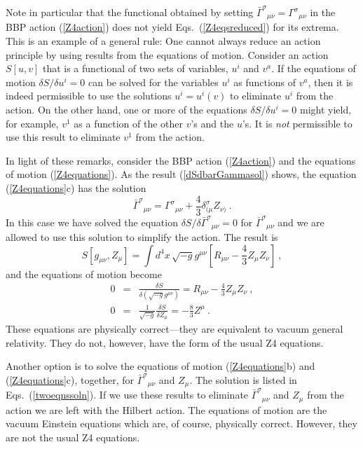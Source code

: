 \documentclass[letterpaper,nofootinbib,prd,amsmath,twocolumn]{revtex4-1}
\begin{document}
Note in particular that the functional obtained by setting 
$\bar\Gamma^\sigma{}_{\mu\nu} = \Gamma^\sigma{}_{\mu\nu}$ in the BBP action (\ref{Z4action}) does 
not yield Eqs.~(\ref{Z4eqsreduced}) for its extrema. 
This is an example of a general rule: One cannot always 
reduce an action principle by using results from the equations of motion. Consider an action $S[u,v]$ that is a functional 
of two sets of variables, $u^i$ and $v^a$. If the equations of motion $\delta S/\delta u^i = 0$ 
can be solved for the variables $u^i$ as functions of $v^a$, 
then it is indeed permissible to use the solutions $u^i = u^i(v)$ to eliminate $u^i$ from the action. 
On the other hand, one or more of the 
equations $\delta S/\delta u^i = 0$ might yield, for example, $v^1$ as a function of the other $v$'s and the $u$'s. 
It is {\it not} permissible to use this result to eliminate $v^1$ from the action. 

In light of these remarks, consider the BBP action (\ref{Z4action}) and the equations of motion 
(\ref{Z4equations}). As the result (\ref{dSdbarGammasol}) shows, the equation (\ref{Z4equations}c) has the solution 
\begin{equation}
	\bar\Gamma^\sigma{}_{\mu\nu}  = \Gamma^\sigma{}_{\mu\nu} + \frac{4}{3} \delta_{(\mu}^\sigma Z_{\nu)} \ .
\end{equation}
In this case we have solved the equation $\delta S/\delta\bar\Gamma^\sigma{}_{\mu\nu} = 0$ 
for $\bar\Gamma^\sigma{}_{\mu\nu}$ and we are allowed to use this solution to simplify the action. The result is 
\begin{equation}\label{altaction}
	S[g_{\mu\nu},Z_\mu] = \int d^4x \, \sqrt{-g}g^{\mu\nu} \left[ R_{\mu\nu} - \frac{4}{3} Z_\mu Z_\nu \right] \ ,
\end{equation}
and the equations of motion become 
\begin{subequations}\label{alteqns}
\begin{eqnarray}
	0 & = & \frac{\delta S}{\delta (\sqrt{-g}g^{\mu\nu})} =  R_{\mu\nu} - \frac{4}{3} Z_\mu Z_\nu \ , \\
	0 & = & \frac{1}{\sqrt{-g}} \frac{\delta S}{\delta Z_\mu} = -\frac{8}{3} Z^\mu  \ .
\end{eqnarray}
\end{subequations}
These equations are physically correct---they are equivalent to vacuum general relativity.   
They do not, however, have the form of the usual Z4 equations.

Another option is to solve the equations of motion (\ref{Z4equations}b) and (\ref{Z4equations}c), together, for 
$\bar\Gamma^\sigma{}_{\mu\nu}$ and $Z_\mu$. The solution is listed in Eqs.~(\ref{twoeqnssoln}). If we use these 
results to eliminate $\bar\Gamma^\sigma{}_{\mu\nu}$ and $Z_\mu$ from the action we are left with the Hilbert 
action. The equations of motion are the vacuum Einstein equations which are, of course, 
physically correct. However, they are not the usual Z4 equations. 
\end{document}
